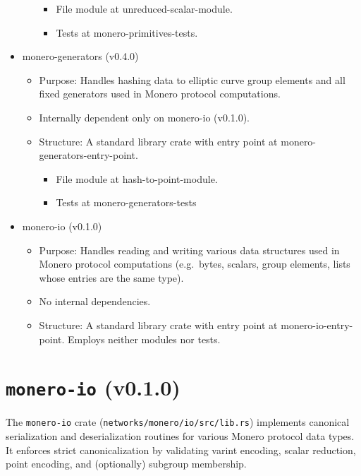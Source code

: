 \documentclass[12pt,a4paper]{article}
\begin{document}
\begin{itemize}
\begin{itemize}
\begin{itemize}
   \item File module at \gls{unreduced-scalar-module}.
   \item Tests at \gls{monero-primitives-tests}.
   \end{itemize}
   \end{itemize}


 
\item \gls{monero-generators (v0.4.0)}
   \begin{itemize}
   \item Purpose: Handles hashing data to elliptic curve group elements and all fixed generators used in Monero protocol computations.
   \item Internally dependent only on \gls{monero-io (v0.1.0)}.
   \item Structure: A standard library crate with entry point at \gls{monero-generators-entry-point}. 
   \begin{itemize}
   
   \item File module at \gls{hash-to-point-module}. 
   \item Tests at \gls{monero-generators-tests}
   \end{itemize}
   \end{itemize}
   
\item \gls{monero-io (v0.1.0)} 
   \begin{itemize}
   \item Purpose: Handles reading and writing various data structures used in Monero protocol computations (e.g.\ bytes, scalars, group elements, lists whose entries are the same type).
   \item No internal dependencies.
   \item Structure: A standard library crate with entry point at \gls{monero-io-entry-point}. Employs neither modules nor tests.   
\end{itemize}

\end{itemize}



\section{\texttt{monero-io} (v0.1.0)}
The \texttt{monero-io} crate (\texttt{networks/monero/io/src/lib.rs}) implements canonical serialization and deserialization routines for various Monero protocol data types. It enforces strict canonicalization by validating varint encoding, scalar reduction, point encoding, and (optionally) subgroup membership.
\end{document}
